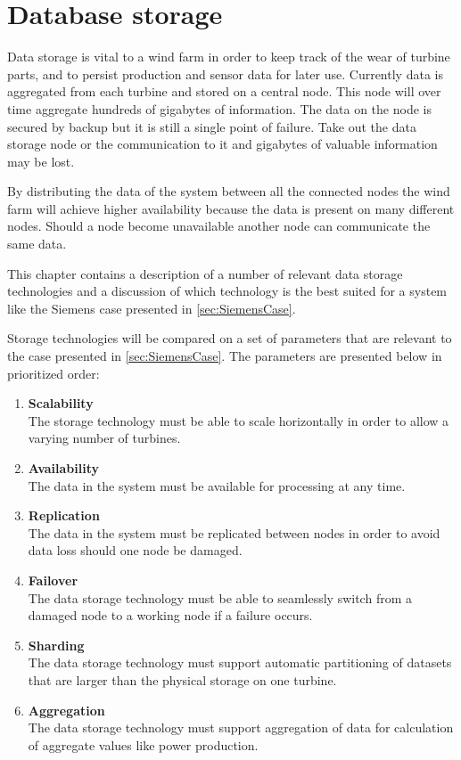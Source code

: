 \section{Database storage}
\label{sec:databaseStorage}
Data storage is vital to a wind farm in order to keep track of the wear of turbine parts, and to persist production and sensor data for later use.
Currently data is aggregated from each turbine and stored on a central node.
This node will over time aggregate hundreds of gigabytes of information.
The data on the node is secured by backup but it is still a single point of failure.
Take out the data storage node or the communication to it and gigabytes of valuable information may be lost.

By distributing the data of the system between all the connected nodes the wind farm will achieve higher availability because the data is present on many different nodes.
Should a node become unavailable another node can communicate the same data.

This chapter contains a description of a number of relevant data storage technologies and a discussion of which technology is the best suited for a system like the Siemens case presented in \cref{sec:SiemensCase}.

Storage technologies will be compared on a set of parameters that are relevant to the case presented in \cref{sec:SiemensCase}. The parameters are presented below in prioritized order:

\begin{enumerate}
\item \textbf{Scalability} \\
The storage technology must be able to scale horizontally in order to allow a varying number of turbines.

\item \textbf{Availability} \\
The data in the system must be available for processing at any time.

\item \textbf{Replication} \\
The data in the system must be replicated between nodes in order to avoid data loss should one node be damaged.

\item \textbf{Failover} \\
The data storage technology must be able to seamlessly switch from a damaged node to a working node if a failure occurs.

\item \textbf{Sharding} \\
The data storage technology must support automatic partitioning of datasets that are larger than the physical storage on one turbine.

\item \textbf{Aggregation} \\
The data storage technology must support aggregation of data for calculation of aggregate values like power production.
\end{enumerate}

